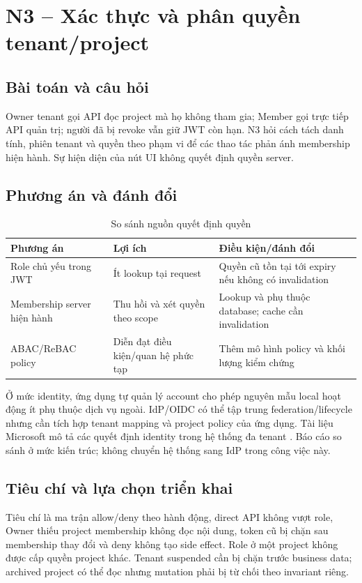 \section{N3 -- Xác thực và phân quyền \texorpdfstring{tenant\slash project}{tenant/project}}\label{sec:n3}
\subsection{Bài toán và câu hỏi}
Owner tenant gọi API đọc project mà họ không tham gia; Member gọi trực tiếp API quản trị; người đã bị revoke vẫn giữ JWT còn hạn. N3 hỏi cách tách danh tính, phiên tenant và quyền theo phạm vi để các thao tác phản ánh membership hiện hành. Sự hiện diện của nút UI không quyết định quyền server.

\subsection{Phương án và đánh đổi}
\begin{table}[htbp]
\centering\caption{So sánh nguồn quyết định quyền}\label{tab:n3-options}
\begin{tabularx}{\textwidth}{P{.23\textwidth}XX}
\toprule Phương án & Lợi ích & Điều kiện\slash đánh đổi \\
\midrule
Role chủ yếu trong JWT & Ít lookup tại request & Quyền cũ tồn tại tới expiry nếu không có invalidation \\
Membership server hiện hành & Thu hồi và xét quyền theo scope & Lookup và phụ thuộc database; cache cần invalidation \\
ABAC\slash ReBAC policy & Diễn đạt điều kiện\slash quan hệ phức tạp & Thêm mô hình policy và khối lượng kiểm chứng \\
\bottomrule\end{tabularx}
\end{table}
Ở mức identity, ứng dụng tự quản lý account cho phép nguyên mẫu local hoạt động ít phụ thuộc dịch vụ ngoài. IdP\slash OIDC có thể tập trung federation\slash lifecycle nhưng cần tích hợp tenant mapping và project policy của ứng dụng. Tài liệu Microsoft mô tả các quyết định identity trong hệ thống đa tenant \citep{azureTenantIdentity}. Báo cáo so sánh ở mức kiến trúc; không chuyển hệ thống sang IdP trong công việc này.

\subsection{Tiêu chí và lựa chọn triển khai}
Tiêu chí là ma trận allow\slash deny theo hành động, direct API không vượt role, Owner thiếu project membership không đọc nội dung, token cũ bị chặn sau membership thay đổi và deny không tạo side effect. Role ở một project không được cấp quyền project khác. Tenant suspended cần bị chặn trước business data; archived project có thể đọc nhưng mutation phải bị từ chối theo invariant riêng.

